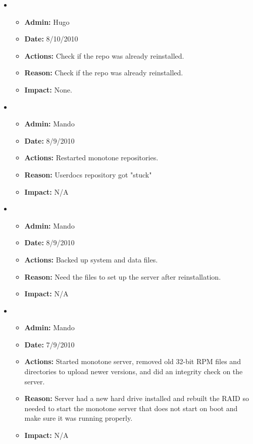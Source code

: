 \documentclass[12pt]{article}
\begin{document}
\begin{itemize}
\item 
\begin{itemize}
\item[] {\bf Admin:} Hugo
\item[] {\bf Date:} 8/10/2010 
\item[] {\bf Actions:} Check if the repo was already reinstalled.
\item[] {\bf Reason:} Check if the repo was already reinstalled.
\item[] {\bf Impact:} None.
\end{itemize}

\item 
\begin{itemize}
\item[] {\bf Admin:} Mando
\item[] {\bf Date:} 8/9/2010 
\item[] {\bf Actions:} Restarted monotone repositories.
\item[] {\bf Reason:} Userdocs repository got "stuck"
\item[] {\bf Impact:} N/A
\end{itemize}

\item 
\begin{itemize}
\item[] {\bf Admin:} Mando
\item[] {\bf Date:} 8/9/2010 
\item[] {\bf Actions:} Backed up system and data files.
\item[] {\bf Reason:} Need the files to set up the server after reinstallation.
\item[] {\bf Impact:} N/A
\end{itemize}

\item 
\begin{itemize}
\item[] {\bf Admin:} Mando
\item[] {\bf Date:} 7/9/2010 
\item[] {\bf Actions:} Started monotone server, removed old 32-bit RPM files and directories to upload newer versions, and did an integrity check on the server.
\item[] {\bf Reason:} Server had a new hard drive installed and rebuilt the RAID so needed to start the monotone server that does not start on boot and make sure it was running properly. 
\item[] {\bf Impact:} N/A
\end{itemize}


\end{itemize}
\end{document}
